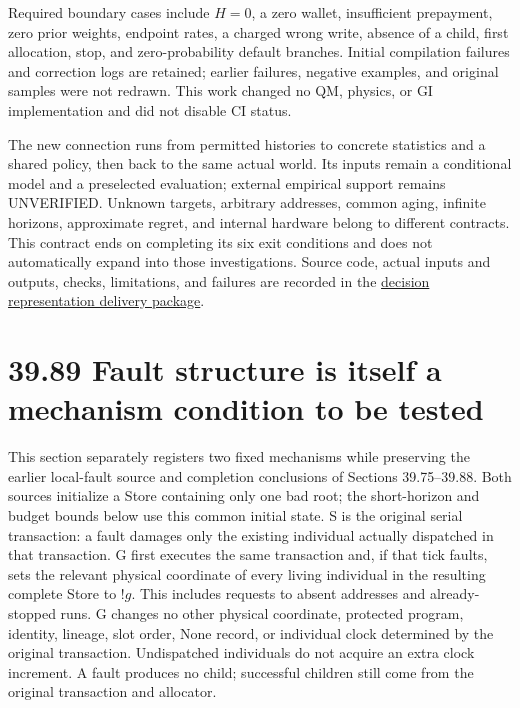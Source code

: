 \documentclass[
  english,
  11pt,
  oneside]{book}
\begin{document}
Required boundary cases include \(H=0\), a zero wallet, insufficient prepayment, zero prior weights, endpoint rates, a charged wrong write, absence of a child, first allocation, stop, and zero-probability default branches. Initial compilation failures and correction logs are retained; earlier failures, negative examples, and original samples were not redrawn. This work changed no QM, physics, or GI implementation and did not disable CI status.

The new connection runs from permitted histories to concrete statistics and a shared policy, then back to the same actual world. Its inputs remain a conditional model and a preselected evaluation; external empirical support remains UNVERIFIED. Unknown targets, arbitrary addresses, common aging, infinite horizons, approximate regret, and internal hardware belong to different contracts. This contract ends on completing its six exit conditions and does not automatically expand into those investigations. Source code, actual inputs and outputs, checks, limitations, and failures are recorded in the \href{../formalization/ueot-core/docs/compression/theory_completion/unified_closure/decision_representation_closure_v1/README.md}{decision representation delivery package}.

\section{39.89 Fault structure is itself a mechanism condition to be tested}\label{fault-structure-is-itself-a-mechanism-condition-to-be-tested}

This section separately registers two fixed mechanisms while preserving the earlier local-fault source and completion conclusions of Sections 39.75--39.88. Both sources initialize a Store containing only one bad root; the short-horizon and budget bounds below use this common initial state. S is the original serial transaction: a fault damages only the existing individual actually dispatched in that transaction. G first executes the same transaction and, if that tick faults, sets the relevant physical coordinate of every living individual in the resulting complete Store to \(!g\). This includes requests to absent addresses and already-stopped runs. G changes no other physical coordinate, protected program, identity, lineage, slot order, None record, or individual clock determined by the original transaction. Undispatched individuals do not acquire an extra clock increment. A fault produces no child; successful children still come from the original transaction and allocator.
\end{document}

